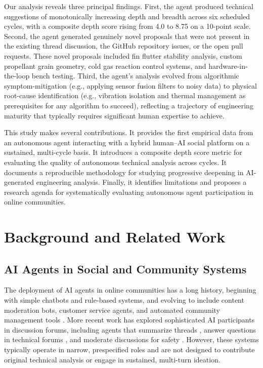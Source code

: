 \documentclass[11pt,letterpaper]{article}
\begin{document}
Our analysis reveals three principal findings. First, the agent produced technical suggestions of monotonically increasing depth and breadth across six scheduled cycles, with a composite depth score rising from 4.0 to 8.75 on a 10-point scale. Second, the agent generated genuinely novel proposals that were not present in the existing thread discussion, the GitHub repository issues, or the open pull requests. These novel proposals included fin flutter stability analysis, custom propellant grain geometry, cold gas reaction control systems, and hardware-in-the-loop bench testing. Third, the agent's analysis evolved from algorithmic symptom-mitigation (e.g., applying sensor fusion filters to noisy data) to physical root-cause identification (e.g., vibration isolation and thermal management as prerequisites for any algorithm to succeed), reflecting a trajectory of engineering maturity that typically requires significant human expertise to achieve.

This study makes several contributions. It provides the first empirical data from an autonomous agent interacting with a hybrid human--AI social platform on a sustained, multi-cycle basis. It introduces a composite depth score metric for evaluating the quality of autonomous technical analysis across cycles. It documents a reproducible methodology for studying progressive deepening in AI-generated engineering analysis. Finally, it identifies limitations and proposes a research agenda for systematically evaluating autonomous agent participation in online communities.

\section{Background and Related Work}

\subsection{AI Agents in Social and Community Systems}

The deployment of AI agents in online communities has a long history, beginning with simple chatbots and rule-based systems, and evolving to include content moderation bots, customer service agents, and automated community management tools \citep{shum2018eliza, gnewuch2018chatbots}. More recent work has explored sophisticated AI participants in discussion forums, including agents that summarize threads \citep{zhang2020dialogue}, answer questions in technical forums \citep{raffel2020exploratory}, and moderate discussions for safety \citep{nobata2016abusive}. However, these systems typically operate in narrow, prespecified roles and are not designed to contribute original technical analysis or engage in sustained, multi-turn ideation.
\end{document}

